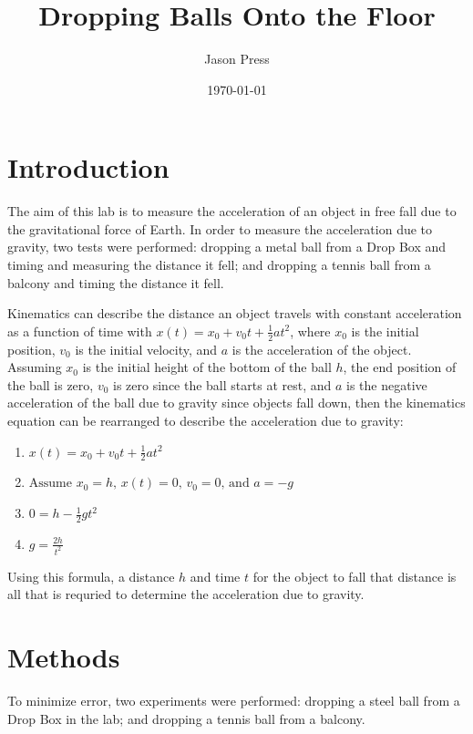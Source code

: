 \documentclass[12pt]{article}
\author{Jason Press}
\date{\today}
\title{Dropping Balls Onto the Floor}
\begin{document}
\maketitle
\begin{abstract}

\end{abstract}
\section{Introduction}
\label{sec:org588762c}

The aim of this lab is to measure the acceleration of an object in free fall due to the gravitational force of Earth. In order to measure the acceleration due to gravity, two tests were performed: dropping a metal ball from a Drop Box and timing and measuring the distance it fell; and dropping a tennis ball from a balcony and timing the distance it fell.

Kinematics can describe the distance an object travels with constant acceleration as a function of time with \(x\left(t\right) = x_{0} + v_{0}t + \frac{1}{2}at^{2}\), where \(x_{0}\) is the initial position, \(v_{0}\) is the initial velocity, and \(a\) is the acceleration of the object. Assuming \(x_{0}\) is the initial height of the bottom of the ball \(h\), the end position of the ball is zero, \(v_{0}\) is zero since the ball starts at rest, and \(a\) is the negative acceleration of the ball due to gravity since objects fall down, then the kinematics equation can be rearranged to describe the acceleration due to gravity:

\begin{enumerate}
\item \(x(t) = x_{0} + v_{0}t + \frac{1}{2}at^{2} \)
\item \( \text{Assume } x_{0} = h \text{, } x(t) = 0 \text{, } v_{0} = 0 \text{, and } a = -g \)
\item \(0 = h - \frac{1}{2} gt^{2} \)
\item \(g = \frac{2h}{t^{2}} \)
\end{enumerate}

Using this formula, a distance \(h\) and time \(t\) for the object to fall that distance is all that is requried to determine the acceleration due to gravity.
\section{Methods}
\label{sec:orgb50ac4f}

To minimize error, two experiments were performed: dropping a steel ball from a Drop Box in the lab; and dropping a tennis ball from a balcony.
\end{document}
